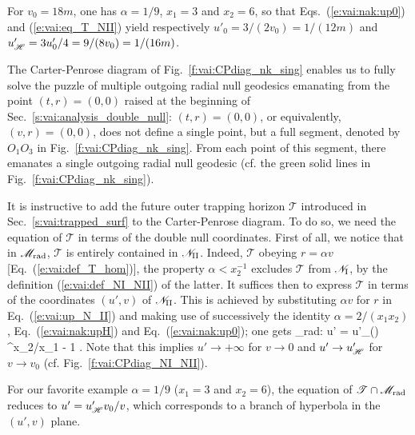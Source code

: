 \begin{texample}{}{}
For $v_0 = 18 m$, one has $\alpha = 1/9$, $x_1 = 3$ and $x_2 = 6$, so that Eqs.~(\ref{e:vai:nak:up0})
and (\ref{e:vai:eq_T_NII}) yield respectively
$u'_0 = 3/(2 v_0) = 1/(12 m)$ and
$u'_{\mathscr{H}} = 3 u'_0 / 4=  9/(8 v_0) = 1/(16 m)$.
\end{texample}

The Carter-Penrose diagram of Fig.~\ref{f:vai:CPdiag_nk_sing} enables us to fully solve the puzzle of multiple outgoing radial null geodesics emanating from the point $(t,r) = (0,0)$ raised at the beginning of
Sec.~\ref{s:vai:analysis_double_null}: $(t,r) = (0,0)$, or equivalently, $(v, r) = (0,0)$,
does not define a single point, but a full segment, denoted by $O_1 O_3$ in Fig.~\ref{f:vai:CPdiag_nk_sing}. From each point of this segment, there emanates a single outgoing radial null geodesic (cf. the green solid lines in Fig.~\ref{f:vai:CPdiag_nk_sing}).

It is instructive to add the future outer trapping horizon $\mathscr{T}$
introduced in Sec.~\ref{s:vai:trapped_surf}
to the Carter-Penrose diagram. To do so, we need the equation of $\mathscr{T}$
in terms of the double null coordinates. First of all, we notice that in $\mathscr{M}_{\rm rad}$, $\mathscr{T}$ is
entirely contained in $\mathscr{N}_{\rm II}$. Indeed, $\mathscr{T}$ obeying
$r = \alpha v$ [Eq.~(\ref{e:vai:def_T_hom})], the property $\alpha < x_2^{-1}$
excludes $\mathscr{T}$ from $\mathscr{N}_{\rm I}$, by the definition
(\ref{e:vai:def_NI_NII}) of the latter. It suffices then to express  $\mathscr{T}$ in terms of the coordinates $(u',v)$ of  $\mathscr{N}_{\rm II}$.
This is achieved by substituting $\alpha v$ for $r$ in Eq.~(\ref{e:vai:up_N_II}) and making use of successively the identity $\alpha = 2/(x_1 x_2)$,
Eq.~(\ref{e:vai:nak:upH}) and Eq.~(\ref{e:vai:nak:up0}); one gets
\be \label{e:vai:eq_T_NII}
     \cap \M_{\rm rad}:\qquad
    u' = u'_\Hor \left(\right) ^{x_2/x_1 - 1} .
\ee
Note that this implies $u'\to +\infty$ for $v\to 0$ and
$u'\to u'_{\mathscr{H}}$ for $v\to v_0$ (cf. Fig.~\ref{f:vai:CPdiag_NI_NII}).

\begin{texample}{}{}
For our favorite example $\alpha = 1/9$ ($x_1 = 3$ and $x_2 = 6$),
the equation of $\mathscr{T} \cap \mathscr{M}_{\rm rad}$ reduces
to $u' = u'_{\mathscr{H}} v_0/v$, which corresponds to a branch of hyperbola in the $(u',v)$ plane.
\end{texample}

